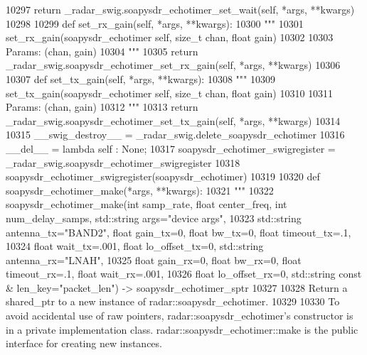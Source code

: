 \begin{DoxyCode}
{{{{{{{{{{{{{{{{{{{{{{{{{{{{{{{{{10297         \textcolor{keywordflow}{return} \_radar\_swig.soapysdr\_echotimer\_set\_wait(self, *args, **kwargs)
10298 
10299     \textcolor{keyword}{def }set_rx_gain(self, *args, **kwargs):
10300         \textcolor{stringliteral}{"""}
10301 \textcolor{stringliteral}{        set\_rx\_gain(soapysdr\_echotimer self, size\_t chan, float gain)}
10302 \textcolor{stringliteral}{}
10303 \textcolor{stringliteral}{        Params: (chan, gain)}
10304 \textcolor{stringliteral}{        """}
10305         \textcolor{keywordflow}{return} \_radar\_swig.soapysdr\_echotimer\_set\_rx\_gain(self, *args, **kwargs)
10306 
10307     \textcolor{keyword}{def }set_tx_gain(self, *args, **kwargs):
10308         \textcolor{stringliteral}{"""}
10309 \textcolor{stringliteral}{        set\_tx\_gain(soapysdr\_echotimer self, size\_t chan, float gain)}
10310 \textcolor{stringliteral}{}
10311 \textcolor{stringliteral}{        Params: (chan, gain)}
10312 \textcolor{stringliteral}{        """}
10313         \textcolor{keywordflow}{return} \_radar\_swig.soapysdr\_echotimer\_set\_tx\_gain(self, *args, **kwargs)
10314 
10315     \_\_swig\_destroy\_\_ = \_radar\_swig.delete\_soapysdr\_echotimer
10316     \_\_del\_\_ = \textcolor{keyword}{lambda} self : \textcolor{keywordtype}{None};
10317 soapysdr\_echotimer\_swigregister = \_radar\_swig.soapysdr\_echotimer\_swigregister
10318 soapysdr_echotimer_swigregister(soapysdr\_echotimer)
10319 
10320 \textcolor{keyword}{def }soapysdr_echotimer_make(*args, **kwargs):
10321   \textcolor{stringliteral}{"""}
10322 \textcolor{stringliteral}{    soapysdr\_echotimer\_make(int samp\_rate, float center\_freq, int num\_delay\_samps, std::string args="device
       args", }
10323 \textcolor{stringliteral}{        std::string antenna\_tx="BAND2", float gain\_tx=0, float bw\_tx=0, float timeout\_tx=.1, }
10324 \textcolor{stringliteral}{        float wait\_tx=.001, float lo\_offset\_tx=0, std::string antenna\_rx="LNAH", }
10325 \textcolor{stringliteral}{        float gain\_rx=0, float bw\_rx=0, float timeout\_rx=.1, float wait\_rx=.001, }
10326 \textcolor{stringliteral}{        float lo\_offset\_rx=0, std::string const & len\_key="packet\_len") -> soapysdr\_echotimer\_sptr}
10327 \textcolor{stringliteral}{}
10328 \textcolor{stringliteral}{    Return a shared\_ptr to a new instance of radar::soapysdr\_echotimer.}
10329 \textcolor{stringliteral}{}
10330 \textcolor{stringliteral}{    To avoid accidental use of raw pointers, radar::soapysdr\_echotimer's constructor is in a private
       implementation class. radar::soapysdr\_echotimer::make is the public interface for creating new instances.}
}}}}}}}}}}}}}}}}}}}}}}}}}}}}}}}}}
\end{DoxyCode}
